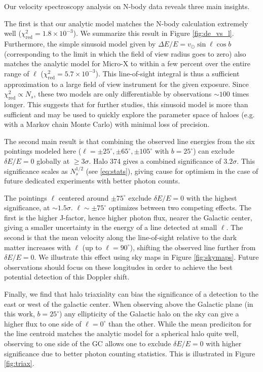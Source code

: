 \documentclass[aps,prd,10pt,twocolumn,superscriptaddress,showpacs]{revtex4-1}
\begin{document}
Our velocity spectroscopy analysis on N-body data reveals three main insights.

The first is that our analytic model matches the N-body calculation
extremely well ($\chi^2_\mathrm{red}=1.8\times 10^{-3}$).  We summarize this result in Figure
\ref{fig:de_vs_l}. Furthermore, the simple sinusoid model given by $\Delta E/E
= v_\odot \sin \ell \cos b$ (corresponding to the limit in which the field of view radius goes to
zero) also matches the analytic model for Micro-X to within a few percent over the entire range of
$\ell$ ($\chi^2_\mathrm{red}=5.7\times 10^{-3}$). This line-of-sight integral is thus
a sufficient approximation to a large field of view instrument for the given exposure. Since
$\chi^2_\mathrm{red} \propto N_s$, these two models are 
only differentiable by observations $\sim 100$ times longer.  
This suggests that for further studies, this sinusoid model is more than sufficient and may be
used to quickly explore the parameter space of haloes (e.g. with a Markov chain Monte Carlo) with minimal loss of precision.

The second main result is that combining the observed line energies from the six pointings modeled
here ($\ell=\pm25^\circ,\pm65^\circ,\pm105^\circ$ with $b=25^\circ$) can exclude
$\delta E/E = 0$ globally at $\geq 3\sigma$.  Halo 374 gives a combined significance of
$3.2\sigma$. This significance scales as $N_s^{1/2}$ (see \eqref{eq:stats}), giving cause for
optimism in the case of future dedicated experiments with better photon counts.

The pointings $\ell$ centered around $\pm75^\circ$ exclude $\delta E/E=0$ with 
the highest significance, at $\sim 1.5\sigma$. $\ell\sim\pm75^\circ$ optimizes between two
competing effects. The first is the higher J-factor, hence higher
photon flux, nearer the Galactic center, giving a smaller uncertainty in the energy of a line
detected at small $\ell$. The second is that the mean velocity along the line-of-sight relative to
the dark matter increases with $\ell$ (up to $\ell=90^\circ$), shifting the observed line further
from $\delta E/E=0$. We illustrate this effect using sky maps in Figure \ref{fig:skymaps}.
Future observations should focus on these longitudes
in order to achieve the best potential detection of this Doppler shift.

Finally, we find that halo triaxiality can bias the significance of a detection to
the east or west of the galactic center. When observing above the Galactic plane (in this work,
$b=25^\circ$) any ellipticity of the Galactic halo on the sky can give a higher flux to one side of
$\ell=0^\circ$ than the other. While the mean prediciton for the line centroid matches the analytic model
for a spherical halo quite well, observing to one side of the GC allows one to exclude $\delta
E/E=0$ with higher significance due to better photon counting statistics. This is illustrated in Figure \ref{fig:triax}.
\end{document}

